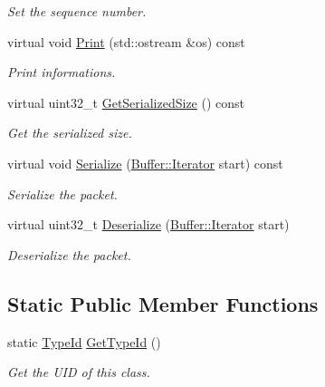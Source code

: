 \begin{DoxyCompactItemize}
\begin{DoxyCompactList}\small\item\em Set the sequence number. \end{DoxyCompactList}\item 
virtual void \hyperlink{classns3_1_1Icmpv6Echo_a6e822b28fceefee9b21145da24757701}{Print} (std\+::ostream \&os) const 
\begin{DoxyCompactList}\small\item\em Print informations. \end{DoxyCompactList}\item 
virtual uint32\+\_\+t \hyperlink{classns3_1_1Icmpv6Echo_adeb482bcfec81438607af7ceee4abb23}{Get\+Serialized\+Size} () const 
\begin{DoxyCompactList}\small\item\em Get the serialized size. \end{DoxyCompactList}\item 
virtual void \hyperlink{classns3_1_1Icmpv6Echo_ae00908cfd1912f20da4ad804ce73ba1d}{Serialize} (\hyperlink{classns3_1_1Buffer_1_1Iterator}{Buffer\+::\+Iterator} start) const 
\begin{DoxyCompactList}\small\item\em Serialize the packet. \end{DoxyCompactList}\item 
virtual uint32\+\_\+t \hyperlink{classns3_1_1Icmpv6Echo_ad3ce875667e23c4b406860d6d95c3385}{Deserialize} (\hyperlink{classns3_1_1Buffer_1_1Iterator}{Buffer\+::\+Iterator} start)
\begin{DoxyCompactList}\small\item\em Deserialize the packet. \end{DoxyCompactList}\end{DoxyCompactItemize}
\subsection*{Static Public Member Functions}
\begin{DoxyCompactItemize}
\item 
static \hyperlink{classns3_1_1TypeId}{Type\+Id} \hyperlink{classns3_1_1Icmpv6Echo_a074cfbf6a13d56dd0fac87168da9c6e4}{Get\+Type\+Id} ()
\begin{DoxyCompactList}\small\item\em Get the U\+ID of this class. \end{DoxyCompactList}\end{DoxyCompactItemize}
